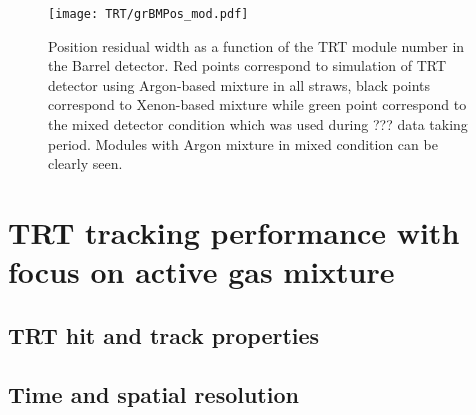 
\begin{figure}
\begin{center}
 \texttt{[image: TRT/grBMPos\_mod.pdf]}
\caption{ Position residual width as a function of the TRT module number in the Barrel detector. Red points correspond to simulation of TRT detector
using Argon-based mixture in all straws, black points correspond to Xenon-based mixture while green point correspond to the mixed detector condition
which was used during ??? data taking period. Modules with Argon mixture in mixed condition can be clearly seen.}
\label{fig:meanFreePath}
\end{center}
\end{figure}




\section{TRT tracking performance with focus on active gas mixture}
\label{sec:digi_argon}


\subsection{TRT hit and track properties}

\subsection{Time and spatial resolution}
\label{subsec:TRT:trackPerf}

